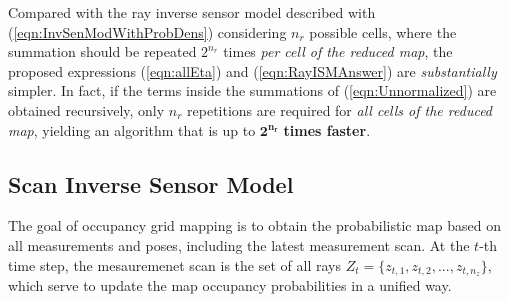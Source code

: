 \documentclass[letterpaper, 10pt, conference]{ieeeconf}
\newcommand{\refeqn}[1]{(\ref{eqn:#1})}
\begin{document}
Compared with the ray inverse sensor model described with \refeqn{InvSenModWithProbDens} considering $n_r$ possible cells, where the summation should be repeated $2^{n_r}$ times \emph{per cell of the reduced map}, the proposed expressions  \refeqn{allEta} and \refeqn{RayISMAnswer} are \textit{substantially} simpler.
In fact, if the terms inside the summations of \refeqn{Unnormalized} are obtained recursively, only $n_r$ repetitions are required for \emph{all cells of the reduced map}, yielding an algorithm that is up to $\mathbf{2^{n_r}}$ \textbf{times faster}.

\subsection{Scan Inverse Sensor Model}

The goal of occupancy grid mapping is to obtain the probabilistic map based on all measurements and poses, including the latest measurement scan.
At the $t$-th time step, the mesauremenet scan is the set of all rays $Z_t=\{z_{t,1},z_{t,2},...,z_{t,n_z}\}$, which serve to update the map occupancy probabilities in a unified way.
\end{document}
